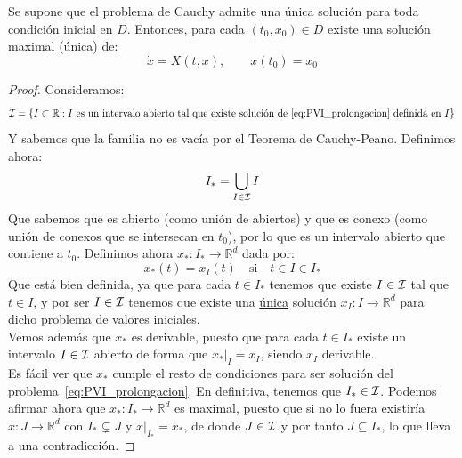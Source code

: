 \begin{prop}
    Se supone que el problema de Cauchy admite una única solución para toda condición inicial en $D$. Entonces, para cada $(t_0,x_0)\in D$ existe una solución maximal (única) de:
    \begin{equation}\label{eq:PVI_prolongacion}
        \dot{x} = X(t,x), \qquad x(t_0) = x_0
    \end{equation}
    \begin{proof}
        Consideramos:
        \begin{equation*}
            \mathcal{I} = \{I\subset \mathbb{R} : I \text{\ es un intervalo abierto tal que existe solución de~\eqref{eq:PVI_prolongacion} definida en\ } I\}
        \end{equation*}
        Y sabemos que la familia no es vacía por el Teorema de Cauchy-Peano. Definimos ahora:
        \begin{equation*}
            I_\ast = \bigcup_{I \in \mathcal{I}}I
        \end{equation*}
        Que sabemos que es abierto (como unión de abiertos) y que es conexo (como unión de conexos que se intersecan en $t_0$), por lo que es un intervalo abierto que contiene a $t_0$. Definimos ahora $x_\ast:I_\ast\to \mathbb{R}^d$ dada por:
        \begin{equation*}
            x_\ast(t) = x_I(t) \quad \text{si}\quad t\in I\in I_\ast
        \end{equation*}
        Que está bien definida, ya que para cada $t\in I_\ast$ tenemos que existe $I\in \mathcal{I}$ tal que $t\in I$, y por ser $I\in \mathcal{I}$ tenemos que existe una \underline{única} solución $x_I:I\to \mathbb{R}^d$ para dicho problema de valores iniciales.\\

        \noindent
        Vemos además que $x_\ast$ es derivable, puesto que para cada $t\in I_\ast$ existe un intervalo $I\in \mathcal{I}$ abierto de forma que $x_\ast\big|_{I} = x_I$, siendo $x_I$ derivable.\\

        \noindent
        Es fácil ver que $x_\ast$ cumple el resto de condiciones para ser solución del problema~\ref{eq:PVI_prolongacion}. En definitiva, tenemos que $I_\ast \in  \mathcal{I}$. Podemos afirmar ahora que $x_\ast:I_\ast\to \mathbb{R}^d$ es maximal, puesto que si no lo fuera existiría $\tilde{x}:J\to \mathbb{R}^d$ con $I_\ast \subsetneq J$ y $\tilde{x}\big|_{I_\ast} = x_\ast$, de donde $J\in \mathcal{I}$ y por tanto $J\subseteq I_\ast$, lo que lleva a una contradicción.
    \end{proof}
\end{prop}

